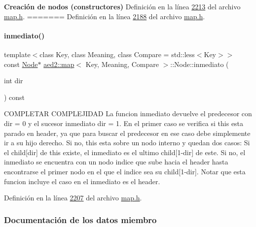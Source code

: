 \begin{Indent}{\bf \-Creación de nodos (constructores)}
\-Definición en la línea \hyperlink{map_8h_source_l02213}{2213} del archivo \hyperlink{map_8h_source}{map.\-h}.
=======
Definición en la línea \hyperlink{map_8h_source_l02188}{2188} del archivo \hyperlink{map_8h_source}{map.\+h}.

\mbox{\label{structaed2_1_1map_1_1Node_af812885685c8c3285136d444d5169b28_af812885685c8c3285136d444d5169b28}} 
\paragraph{\texorpdfstring{inmediato()}{inmediato()}}
{\footnotesize\ttfamily template$<$class Key, class Meaning, class Compare = std\+::less$<$\+Key$>$$>$ \\
const \hyperlink{structaed2_1_1map_1_1Node}{Node}$\ast$ \hyperlink{classaed2_1_1map}{aed2\+::map}$<$ Key, Meaning, Compare $>$\+::Node\+::inmediato (\begin{DoxyParamCaption}\item[{int}]{dir }\end{DoxyParamCaption}) const\hspace{0.3cm}{\ttfamily [inline]}}

C\+O\+M\+P\+L\+E\+T\+AR C\+O\+M\+P\+L\+E\+J\+I\+D\+AD La funcion inmediato devuelve el predecesor con dir = 0 y el sucesor inmediato dir = 1. En el primer caso se verifica si this esta parado en header, ya que para buscar el predecesor en ese caso debe simplemente ir a su hijo derecho. Si no, this esta sobre un nodo interno y quedan dos casos\+: Si el child\mbox{[}dir\mbox{]} de this existe, el inmediato es el ultimo child\mbox{[}1-\/dir\mbox{]} de este. Si no, el inmediato se encuentra con un nodo indice que sube hacia el header hasta encontrarse el primer nodo en el que el indice sea su child\mbox{[}1-\/dir\mbox{]}. Notar que esta funcion incluye el caso en el inmediato es el header. 

Definición en la línea \hyperlink{map_8h_source_l02207}{2207} del archivo \hyperlink{map_8h_source}{map.\+h}.



\subsubsection{Documentación de los datos miembro}
\mbox{\label{structaed2_1_1map_1_1Node_a7d65c374c73c443a46d8fc224aff9e82_a7d65c374c73c443a46d8fc224aff9e82}} 

\end{Indent}

